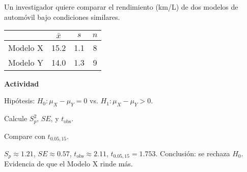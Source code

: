 \begin{ejercicio}
Un investigador quiere comparar el rendimiento (km/L) de dos modelos de automóvil bajo condiciones similares.

\begin{center}
\begin{tabular}{@{}lccc@{}}
\toprule
 & $\bar{x}$ & $s$ & $n$ \\
\midrule
Modelo X & 15.2 & 1.1 & 8 \\
Modelo Y & 14.0 & 1.3 & 9 \\
\bottomrule
\end{tabular}
\end{center}

\textbf{Actividad}
\begin{pasos}
  \item Hipótesis: $H_0:\mu_X-\mu_Y=0$ vs. $H_1:\mu_X-\mu_Y>0$.
  \item Calcule $S_p^2$, $SE$, y $t_{\text{obs}}$.
  \item Compare con $t_{0.05,15}$.
\end{pasos}

\begin{clave}
$S_p\approx1.21$, $SE\approx0.57$, $t_{\text{obs}}\approx2.11$, $t_{0.05,15}=1.753$.
Conclusión: se rechaza $H_0$. Evidencia de que el Modelo X rinde más.
\end{clave}
\end{ejercicio}